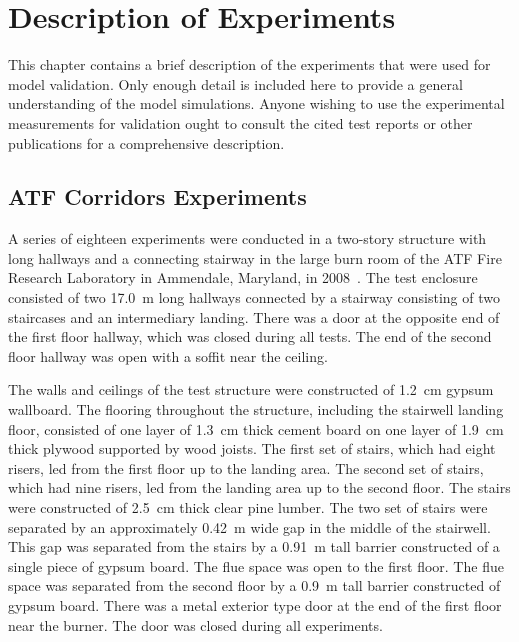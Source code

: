 \chapter{Description of Experiments}

\label{Experiments_Chapter}

This chapter contains a brief description of the experiments that were used for model validation. Only enough detail is included here to provide a
general understanding of the model simulations. Anyone wishing to use the experimental measurements for validation ought to consult the cited test reports
or other publications for a comprehensive description.


\section{ATF Corridors Experiments}

A series of eighteen experiments were conducted in a two-story structure with long hallways and a connecting stairway
in the large burn room of the ATF Fire Research Laboratory in Ammendale, Maryland, in 2008~\cite{Sheppard:Corridors}.
The test enclosure consisted of two 17.0~m long hallways connected by a
stairway consisting of two staircases and an intermediary landing.
There was a door at the opposite end of the first floor hallway, which was closed during all tests.
The end of the second floor hallway was open with a soffit near the ceiling.

The walls and ceilings of the test structure were constructed of 1.2~cm gypsum wallboard.
The flooring throughout the structure, including the stairwell landing floor, consisted of one layer of 1.3~cm thick cement board on one
layer of 1.9~cm thick plywood supported by wood joists. The first set of stairs, which had eight risers, led from the first floor up to the landing area.
The second set of stairs, which had nine risers, led from the landing area up to the second floor.
The stairs were constructed of 2.5~cm thick clear pine lumber. The two set of stairs were separated by an approximately 0.42~m wide gap in the middle of the stairwell.
This gap was separated from the stairs by a 0.91~m tall barrier constructed of a single piece of gypsum board.
The flue space was open to the first floor.  The flue space was separated from the second floor by a 0.9~m tall barrier constructed of gypsum board.
There was a metal exterior type door at the end of the first floor near the burner.  The door was closed during all experiments.

